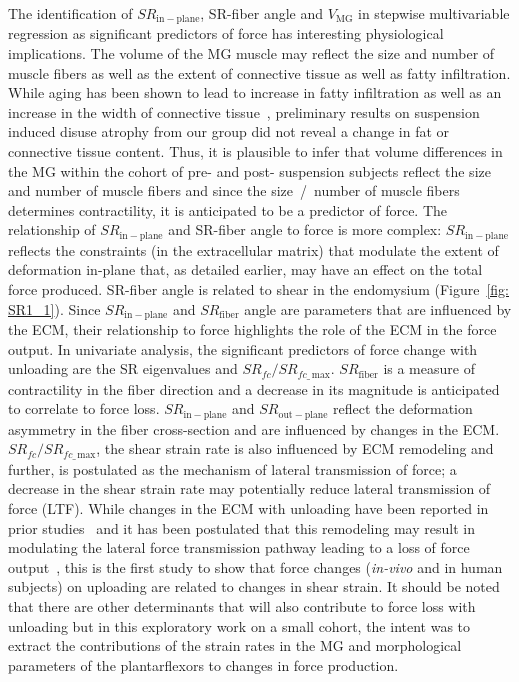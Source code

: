 The identification of $SR_{\mathrm{in-plane}}$, SR-fiber angle and $V_{\mathrm{MG}}$ in stepwise multivariable regression as significant predictors of force has interesting physiological implications. 
The volume of the MG muscle may reflect the size and number of muscle fibers as well as the extent of connective tissue as well as fatty infiltration. 
While aging has been shown to lead to increase in fatty infiltration as well as an increase in the width of connective tissue~\cite{RNS39}, preliminary results on suspension induced disuse atrophy from our group did not reveal a change in fat or connective tissue content.
Thus, it is plausible to infer that volume differences in the MG within the cohort of pre- and post- suspension subjects reflect the size and number of muscle fibers and since the size~/~number of muscle fibers determines contractility, it is anticipated to be a predictor of force.
The relationship of $SR_{\mathrm{in-plane}}$ and SR-fiber angle to force is more complex: $SR_{\mathrm{in-plane}}$ reflects the constraints (in the extracellular matrix) that modulate the extent of deformation in-plane that, as detailed earlier, may have an effect on the total force produced. 
SR-fiber angle is related to shear in the endomysium (Figure~\ref{fig: SR1_1}).
Since $SR_{\mathrm{in-plane}}$ and $SR_{\mathrm{fiber}}$ angle are parameters that are influenced by the ECM, their relationship to force highlights the role of the ECM in the force output.
In univariate analysis, the significant predictors of force change with unloading are the SR eigenvalues and $SR_{fc}/SR_{fc\_\,\mathrm{max}}$.
 $SR_{\mathrm{fiber}}$ is a measure of contractility in the fiber direction and a decrease in its magnitude is anticipated to correlate to force loss.  $SR_{\mathrm{in-plane}}$ and $SR_{\mathrm{out-plane}}$ reflect the deformation asymmetry in the fiber cross-section and are influenced by changes in the ECM. 
$SR_{fc}/SR_{fc\_\,\mathrm{max}}$, the shear strain rate is also influenced by ECM remodeling and further, is postulated as the mechanism of lateral transmission of force; a decrease in the shear strain rate may potentially reduce lateral transmission of force (LTF). 
While changes in the ECM with unloading have been reported in prior studies~\cite{RNS13} and it has been postulated that this remodeling may result in modulating the lateral force transmission pathway leading to a loss of force output~\cite{RNIRamaswamy}, this is the first study to show that force changes (\textit{in-vivo} and in human subjects) on uploading are related to changes in shear strain. 
It should be noted that there are other determinants that will also contribute to force loss with unloading but in this exploratory work on a small cohort, the intent was to extract the contributions of the strain rates in the MG and morphological parameters of the plantarflexors to changes in force production. 

